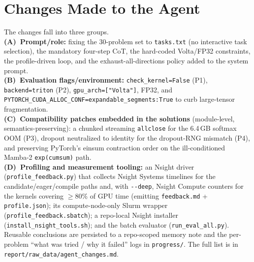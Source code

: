 \documentclass[conference]{IEEEtran}
\begin{document}
\section{Changes Made to the Agent}
\label{app:changes}
The changes fall into three groups. \\
\textbf{(A)~Prompt/role:} fixing the
30-problem set to \texttt{tasks.txt} (no interactive task selection), the
mandatory four-step CoT, the hard-coded Volta/FP32 constraints, the
profile-driven loop, and the exhaust-all-directions policy added to the system
prompt. \\
\textbf{(B)~Evaluation flags/environment:} \texttt{check\_kernel=False}
(P1), \texttt{backend=triton} (P2), \texttt{gpu\_arch=["Volta"]}, FP32, and
\texttt{PYTORCH\_CUDA\_ALLOC\_CONF=expandable\_segments:True} to curb large-tensor
fragmentation. \\
\textbf{(C)~Compatibility patches embedded in the solutions}
(module-level, semantics-preserving): a chunked streaming \texttt{allclose} for
the 6.4\,GB softmax OOM (P3), dropout neutralized to identity for the dropout-RNG
mismatch (P4), and preserving PyTorch's einsum contraction order on the
ill-conditioned Mamba-2 \texttt{exp(cumsum)} path. \\
\textbf{(D)~Profiling and measurement tooling:} an Nsight driver
(\texttt{profile\_feedback.py}) that collects Nsight Systems timelines for the
candidate/eager/compile paths and, with \texttt{-{}-deep}, Nsight Compute
counters for the kernels covering $\ge$80\% of GPU time (emitting
\texttt{feedback.md} + \texttt{profile.json}); its compute-node-only Slurm
wrapper (\texttt{profile\_feedback.sbatch}); a repo-local Nsight installer
(\texttt{install\_nsight\_tools.sh}); and the batch evaluator
(\texttt{run\_eval\_all.py}). Reusable conclusions are
persisted to a repo-scoped memory note and the per-problem ``what was tried /
why it failed'' logs in \texttt{progress/}. The full list is in
\texttt{report/raw\_data/agent\_changes.md}.
\end{document}
